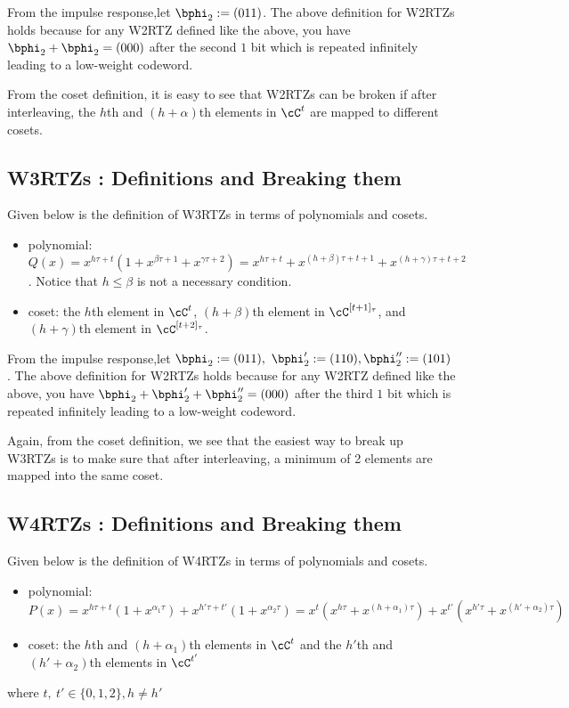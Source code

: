 From the impulse response,let $\bphi_2:=(0 1 1)$. The above definition for W2RTZs holds because for any W2RTZ defined like the above, you have $\bphi_2+\bphi_2=(0 0 0)$ after the second $1$ bit which is repeated infinitely leading to a low-weight codeword.


From the coset definition, it is easy to see that W2RTZs can be broken if after interleaving,  the $h$th and $(h+\alpha)$th elements in $\cC^t$ are mapped to different cosets.

\subsection{W3RTZs : Definitions and Breaking them}
Given below is the definition of W3RTZs in terms of polynomials and cosets.
\begin{itemize}
	\item polynomial: $Q(x) =x^{h\tau+t}(1+x^{\beta \tau +1}+x^{\gamma \tau +2})=x^{h\tau+t}+x^{(h+\beta) \tau +t+1}+x^{(h+\gamma) \tau +t+2}$. 
	Notice that $h \leq \beta$ is not a necessary condition.
	\item coset: the $h$th element in $\cC^{t}$, $(h+\beta)$th element in $\cC^{[t+1]_\tau}$, and $(h+\gamma)$th element in $\cC^{[t+2]_\tau}$.
\end{itemize}

From the impulse response,let $\bphi_2:=(0 1 1),~\bphi_2':=(1 1 0),\bphi_2'':=(1 0 1)$. The above definition for W2RTZs holds because for any W2RTZ defined like the above, you have $\bphi_2+\bphi_2'+\bphi_2''=(0 0 0)$ after the third $1$ bit which is repeated infinitely leading to a low-weight codeword.

Again, from the coset definition, we see that the easiest way to break up W3RTZs is to make sure that after interleaving, a minimum of 2 elements are mapped into the same coset.

\subsection{W4RTZs : Definitions and Breaking them}
Given below is the definition of W4RTZs in terms of polynomials and cosets.
\begin{itemize}
	\item polynomial: $P(x)=x^{h\tau+t}(1+x^{\alpha_1 \tau}) + x^{h'\tau+t'}(1+x^{\alpha_2 \tau})= x^t(x^{h\tau}+x^{(h+\alpha_1)\tau}) + x^{t'}(x^{h'\tau}+x^{(h'+\alpha_2)\tau})$
	\item coset: the $h$th and $(h+\alpha_1)$th elements in $\cC^t$ and  the $h'$th and $(h'+\alpha_2)$th elements in $\cC^{t'}$ 
\end{itemize}
where $t,~t' \in\{0,1,2\},h \neq h'$

